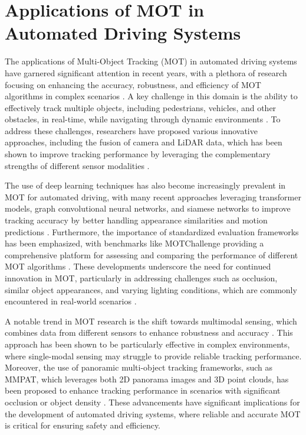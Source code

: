 \documentclass[conference]{IEEEtran}
\begin{document}
\section{Applications of MOT in Automated Driving Systems}
The applications of Multi-Object Tracking (MOT) in automated driving systems have garnered significant attention in recent years, with a plethora of research focusing on enhancing the accuracy, robustness, and efficiency of MOT algorithms in complex scenarios \cite{Multiple Object Tracking in Recent Times: A Literature Review}. A key challenge in this domain is the ability to effectively track multiple objects, including pedestrians, vehicles, and other obstacles, in real-time, while navigating through dynamic environments \cite{Multi-Object Tracking with Camera-LiDAR Fusion for Autonomous Driving}. To address these challenges, researchers have proposed various innovative approaches, including the fusion of camera and LiDAR data, which has been shown to improve tracking performance by leveraging the complementary strengths of different sensor modalities \cite{Know Your Surroundings: Panoramic Multi-Object Tracking by Multimodality Collaboration}.

The use of deep learning techniques has also become increasingly prevalent in MOT for automated driving, with many recent approaches leveraging transformer models, graph convolutional neural networks, and siamese networks to improve tracking accuracy by better handling appearance similarities and motion predictions \cite{MOTChallenge: A Benchmark for Single-Camera Multiple Target Tracking}. Furthermore, the importance of standardized evaluation frameworks has been emphasized, with benchmarks like MOTChallenge providing a comprehensive platform for assessing and comparing the performance of different MOT algorithms \cite{MOTChallenge: A Benchmark for Single-Camera Multiple Target Tracking}. These developments underscore the need for continued innovation in MOT, particularly in addressing challenges such as occlusion, similar object appearances, and varying lighting conditions, which are commonly encountered in real-world scenarios \cite{Multiple Object Tracking: A Literature Review}.

A notable trend in MOT research is the shift towards multimodal sensing, which combines data from different sensors to enhance robustness and accuracy \cite{Multi-Object Tracking with Camera-LiDAR Fusion for Autonomous Driving}. This approach has been shown to be particularly effective in complex environments, where single-modal sensing may struggle to provide reliable tracking performance. Moreover, the use of panoramic multi-object tracking frameworks, such as MMPAT, which leverages both 2D panorama images and 3D point clouds, has been proposed to enhance tracking performance in scenarios with significant occlusion or object density \cite{Know Your Surroundings: Panoramic Multi-Object Tracking by Multimodality Collaboration}. These advancements have significant implications for the development of automated driving systems, where reliable and accurate MOT is critical for ensuring safety and efficiency.
\end{document}
